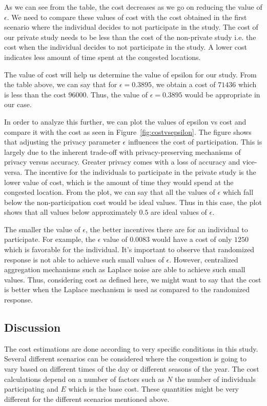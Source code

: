 \documentclass[conference]{IEEEtran}
\begin{document}
As we can see from the table, the cost decreases as we go on reducing the value of $\epsilon$. We need to compare these values of cost with the cost obtained in the first scenario where the individual decides to not participate in the study. The cost of our private study needs to be less than the cost of the non-private study i.e. the cost when the individual decides to not participate in the study. A lower cost indicates less amount of time spent at the congested locations.

The value of cost will help us determine the value of epsilon for our study. From the table above, we can say that for $\epsilon = 0.3895$, we obtain a cost of $71436$ which is less than the cost $96000$. Thus, the value of $\epsilon = 0.3895$ would be appropriate in our case.
	
In order to analyze this further, we can plot the values of epsilon vs cost and compare it with the cost as seen in Figure~\ref{fig:costvsepsilon}. The figure shows that adjusting the privacy parameter $\epsilon$ influences the cost of participation. This is largely due to the inherent trade-off with privacy-preserving mechanisms of privacy versus accuracy. Greater privacy comes with a loss of accuracy and vice-versa.  The incentive for the individuals to participate in the private study is the lower value of cost, which is the amount of time they would spend at the congested location. From the plot, we can say that all the values of $\epsilon$ which fall below the non-participation cost would be ideal values. Thus in this case, the plot shows that all values below approximately $0.5$ are ideal values of $\epsilon$. 

The smaller the value of $\epsilon$, the better incentives there are for an individual to participate. For example, the $\epsilon$ value of $0.0083$ would have a cost of only $1250$ which is favorable for the individual. It's important to observe that randomized response is not able to achieve such small values of $\epsilon$. However, centralized aggregation mechanisms such as Laplace noise are able to achieve such small values. Thus, considering cost as defined here, we might want to say that the cost is better when the Laplace mechanism is used as compared to the randomized response. 

\subsection{Discussion}

The cost estimations are done according to very specific conditions in this study. Several different scenarios can be considered  where the congestion is going to vary based on different times of the day or different seasons of the year. The cost calculations depend on a number of factors such as $N$ the number of individuals participating and $E$ which is the base cost. These quantities might be very different for the different scenarios mentioned above. 
	
\end{document}
